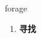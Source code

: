 
\begin{frame}
{\huge forage}
\begin{center}
\begin{enumerate}\Large
  \item \textbf{寻找}
\end{enumerate}
\end{center}
\end{frame}
